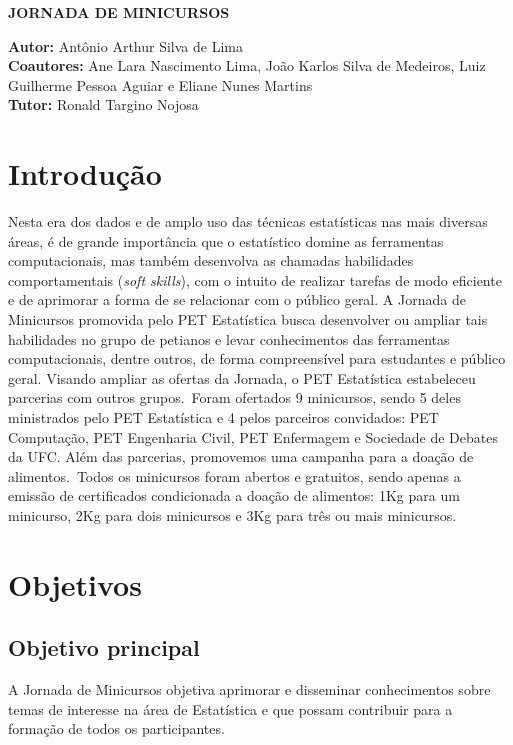 \documentclass{sciposter}
\begin{document}
\begin{center}
\LARGE \bf{JORNADA DE MINICURSOS}
\end{center}
\vspace{0.2cm}
\begin{center}
 \large \textbf{Autor:} Antônio Arthur Silva de Lima \\
\large \textbf{Coautores:} Ane Lara Nascimento Lima, João Karlos Silva de Medeiros, Luiz Guilherme Pessoa Aguiar e Eliane Nunes Martins \\
\large \textbf{Tutor:} Ronald Targino Nojosa \\
\end{center}
\vspace{-0.2cm}
\begin{multicols}{2}
{\large
\vspace{0.35cm}
\section{Introdução}
Nesta era dos dados e de amplo uso das técnicas estatísticas nas mais diversas áreas, é de grande importância que o estatístico domine as ferramentas computacionais, mas também desenvolva as chamadas habilidades comportamentais (\textit{soft skills}), com o intuito de realizar tarefas de modo eficiente e de aprimorar a forma de se relacionar com o público geral. A Jornada de Minicursos promovida pelo PET Estatística busca desenvolver ou ampliar tais habilidades no grupo de petianos e levar conhecimentos das ferramentas computacionais, dentre outros, de forma compreensível para estudantes e público geral. 
Visando ampliar as ofertas da Jornada, o PET Estatística estabeleceu parcerias com outros grupos.\ Foram ofertados 9 minicursos, sendo 5 deles ministrados pelo PET Estatística e 4 pelos parceiros convidados: PET Computação, PET Engenharia Civil, PET Enfermagem e Sociedade de Debates da UFC. Além das parcerias, promovemos uma campanha para a doação de alimentos.\ Todos os minicursos foram abertos e gratuitos, sendo apenas a emissão de certificados condicionada a doação de alimentos: 1Kg para um minicurso, 2Kg para dois minicursos  e 3Kg para três ou mais minicursos.

\section{Objetivos}
 \subsection{Objetivo principal}
 A Jornada de Minicursos objetiva aprimorar e disseminar conhecimentos sobre temas de interesse na área de Estatística e que possam contribuir para a formação de todos os participantes.

}
\end{multicols}
\end{document}
